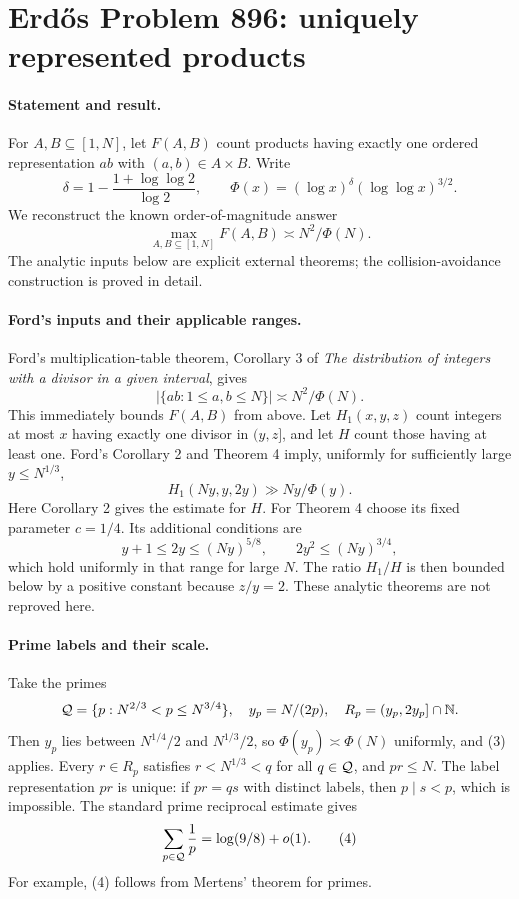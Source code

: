 \section*{Erd\H{o}s Problem 896: uniquely represented products}

\paragraph{Statement and result.}
For \(A,B\subseteq[1,N]\), let \(F(A,B)\) count products
having exactly one ordered representation \(ab\) with
\((a,b)\in A\times B\). Write
\[
 \delta=1-\frac{1+\log\log2}{\log2},\qquad
 \Phi(x)=(\log x)^\delta(\log\log x)^{3/2}.
\]
We reconstruct the known order-of-magnitude answer
\[
 \max_{A,B\subseteq[1,N]}F(A,B)\asymp N^2/\Phi(N).
\tag{1}
\]
The analytic inputs below are explicit external theorems;
the collision-avoidance construction is proved in detail.

\paragraph{Ford's inputs and their applicable ranges.}
Ford's multiplication-table theorem, Corollary 3 of
\emph{The distribution of integers with a divisor in a given
interval}, gives
\[
 |\{ab:1\leq a,b\leq N\}|\asymp N^2/\Phi(N).
\tag{2}
\]
This immediately bounds \(F(A,B)\) from above.
Let \(H_1(x,y,z)\) count integers at most \(x\) having
exactly one divisor in \((y,z]\), and let \(H\) count those
having at least one. Ford's Corollary 2 and Theorem 4 imply,
uniformly for sufficiently large \(y\leq N^{1/3}\),
\[
 H_1(Ny,y,2y)\gg Ny/\Phi(y).
\tag{3}
\]
Here Corollary 2 gives the estimate for \(H\).
For Theorem 4 choose its fixed parameter \(c=1/4\).
Its additional conditions are
\[
 y+1\leq2y\leq(Ny)^{5/8},
 \qquad 2y^2\leq(Ny)^{3/4},
\]
which hold uniformly in that range for large \(N\).
The ratio \(H_1/H\) is then bounded below by a positive
constant because \(z/y=2\).
These analytic theorems are not reproved here.

\paragraph{Prime labels and their scale.}
Take the primes
\[
 {\cal Q}=\{p:N^{2/3}<p\leq N^{3/4}\},
 \quad y_p=N/(2p),\quad
 R_p=(y_p,2y_p]\cap\mathbb N.
\]
Then \(y_p\) lies between \(N^{1/4}/2\) and \(N^{1/3}/2\),
so \(\Phi(y_p)\asymp\Phi(N)\) uniformly, and (3) applies.
Every \(r\in R_p\) satisfies \(r<N^{1/3}<q\) for all
\(q\in{\cal Q}\), and \(pr\leq N\).
The label representation \(pr\) is unique: if
\(pr=qs\) with distinct labels, then \(p\mid s<p\),
which is impossible.
The standard prime reciprocal estimate gives
\[
 \sum_{p\in{\cal Q}}\frac1p
 =\log(9/8)+o(1).
\tag{4}
\]
For example, (4) follows from Mertens' theorem for primes.

